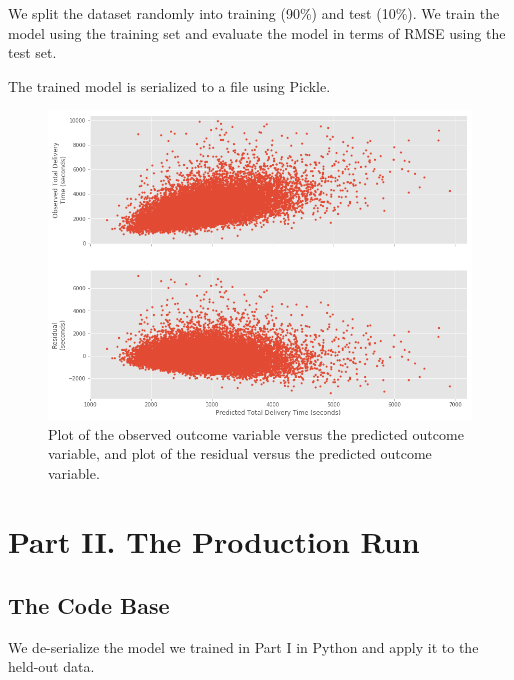 \documentclass[12pt]{article}
\begin{document}
We split the dataset randomly into training (90\%) and test (10\%). We train the model using the training set and evaluate the model in terms of RMSE using the test set.

The trained model is serialized to a file using Pickle.


\begin{figure}[H]
\centering
\includegraphics[width=6in]{graphics/results.png}
\caption{Plot of the observed outcome variable versus the predicted outcome variable, and plot of the residual versus the predicted outcome variable.}
\label{fig:results01}
\end{figure}






\section{Part II. The Production Run}

\subsection{The Code Base}
We de-serialize the model we trained in Part I in Python and apply it to the held-out data.
\end{document}
